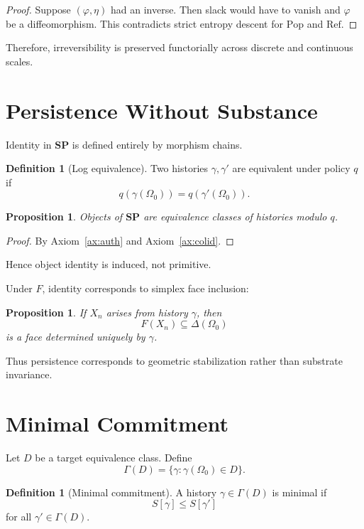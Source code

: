 \documentclass[12pt,a4paper]{article}
\newtheorem{proposition}[theorem]{Proposition}
\theoremstyle{definition}
\newtheorem{definition}[theorem]{Definition}
\theoremstyle{remark}
\newcommand{\SP}{\mathbf{SP}}
\newcommand{\Pop}{\ensuremath{\mathrm{Pop}}}
\newcommand{\RefOp}{\ensuremath{\mathrm{Ref}}}
\begin{document}
\begin{proof}
Suppose $(\varphi,\eta)$ had an inverse. Then slack would have to vanish
and $\varphi$ be a diffeomorphism. This contradicts strict entropy
descent for $\Pop$ and $\RefOp$.
\end{proof}

Therefore, irreversibility is preserved functorially across discrete
and continuous scales.

\section{Persistence Without Substance}
\label{sec:persistence}

Identity in $\SP$ is defined entirely by morphism chains.

\begin{definition}[Log equivalence]
Two histories $\gamma,\gamma'$ are equivalent under policy $q$ if
\[
  q(\gamma(\Omega_0)) = q(\gamma'(\Omega_0)).
\]
\end{definition}

\begin{proposition}
Objects of $\SP$ are equivalence classes of histories modulo $q$.
\end{proposition}

\begin{proof}
By Axiom~\ref{ax:auth} and Axiom~\ref{ax:colid}.
\end{proof}

Hence object identity is induced, not primitive.

Under $F$, identity corresponds to simplex face inclusion:

\begin{proposition}
If $X_n$ arises from history $\gamma$, then
\[
  F(X_n) \subseteq \Delta(\Omega_0)
\]
is a face determined uniquely by $\gamma$.
\end{proposition}

Thus persistence corresponds to geometric stabilization rather than
substrate invariance.

\section{Minimal Commitment}
\label{sec:minimal}

Let $D$ be a target equivalence class. Define
\[
  \Gamma(D) = \{\gamma : \gamma(\Omega_0) \in D\}.
\]

\begin{definition}[Minimal commitment]
A history $\gamma \in \Gamma(D)$ is minimal if
\[
  S[\gamma] \le S[\gamma']
\]
for all $\gamma' \in \Gamma(D)$.
\end{definition}
\end{document}
